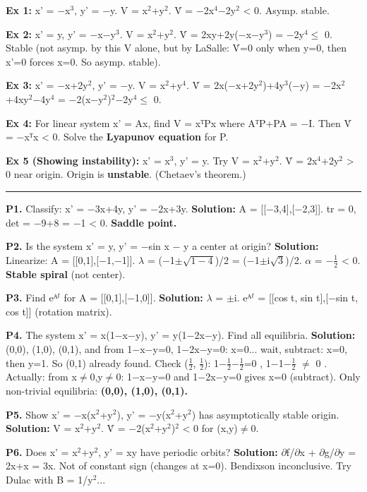 \documentclass[12pt,a4paper,openany]{book}
\begin{document}
{{\textbf{Ex 1:} x' = −x$^3$, y' = −y. V = x$^2$+y$^2$. V̇ = −2x$^4$−2y$^2$ < 0. Asymp. stable. 

\textbf{Ex 2:} x' = y, y' = −x−y$^3$. V = x$^2$+y$^2$. V̇ = 2xy+2y(−x−y$^3$) = −2y$^4\leq$ 0. Stable (not asymp. by this V alone, but by LaSalle: V̇=0 only when y=0, then x'=0 forces x=0. So asymp. stable). 

\textbf{Ex 3:} x' = −x+2y$^2$, y' = −y. V = x$^2$+y$^4$. V̇ = 2x(−x+2y$^2$)+4y$^3$(−y) = −2x$^2$+4xy$^2$−4y$^4$ = −2(x−y$^2$)$^2$−2y$^4\leq$ 0. 

\textbf{Ex 4:} For linear system x' = Ax, find V = xᵀPx where AᵀP+PA = −I. Then V̇ = −xᵀx < 0. Solve the \textbf{Lyapunov equation} for P.

\textbf{Ex 5 (Showing instability):} x' = x$^3$, y' = y. Try V = x$^2$+y$^2$. V̇ = 2x$^4$+2y$^2$ > 0 near origin. Origin is \textbf{unstable}. (Chetaev's theorem.)

\bigskip\noindent\rule{\textwidth}{0.4pt}\bigskip


\textbf{P1.} Classify: x' = −3x+4y, y' = −2x+3y. 
\textbf{Solution:} A = [[−3,4],[−2,3]]. tr = 0, det = −9+8 = −1 < 0. \textbf{Saddle point.}

\textbf{P2.} Is the system x' = y, y' = −sin x − y a center at origin?
\textbf{Solution:} Linearize: A = [[0,1],[−1,−1]]. $\lambda$ = (−1$\pm$$\sqrt{1−4}$)/2 = (−1$\pm$i$\sqrt{3}$)/2. $\alpha$ = −$\frac{1}{2}$ < 0. \textbf{Stable spiral} (not center).

\textbf{P3.} Find eᴬ$^t$ for A = [[0,1],[−1,0]].
\textbf{Solution:} $\lambda$ = $\pm$i. eᴬ$^t$ = [[cos t, sin t],[−sin t, cos t]] (rotation matrix).

\textbf{P4.} The system x' = x(1−x−y), y' = y(1−2x−y). Find all equilibria.
\textbf{Solution:} (0,0), (1,0), (0,1), and from 1−x−y=0, 1−2x−y=0: x=0... wait, subtract: x=0, then y=1. So (0,1) already found. Check ($\frac{1}{2}$, $\frac{1}{2}$): 1−$\frac{1}{2}$−$\frac{1}{2}$=0 , 1−1−$\frac{1}{2}$ $\neq$ 0 . Actually: from x$\neq$0,y$\neq$0: 1−x−y=0 and 1−2x−y=0 gives x=0 (subtract). Only non-trivial equilibria: \textbf{(0,0), (1,0), (0,1).}

\textbf{P5.} Show x' = −x(x$^2$+y$^2$), y' = −y(x$^2$+y$^2$) has asymptotically stable origin.
\textbf{Solution:} V = x$^2$+y$^2$. V̇ = −2(x$^2$+y$^2$)$^2$ < 0 for (x,y)$\neq$0. 

\textbf{P6.} Does x' = x$^2$+y$^2$, y' = xy have periodic orbits?
\textbf{Solution:} $\partial$f/$\partial$x + $\partial$g/$\partial$y = 2x+x = 3x. Not of constant sign (changes at x=0). Bendixson inconclusive. Try Dulac with B = 1/y$^2$...

}}
\end{document}
